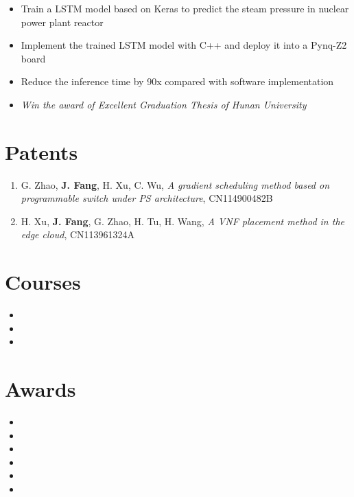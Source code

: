 \documentclass{resume}
\begin{document}
\begin{itemize}
  \item Train a LSTM model based on Keras to predict the steam pressure in nuclear power plant reactor
  \item Implement the trained LSTM model with C++ and deploy it into a Pynq-Z2 board
  \item Reduce the inference time by 90x compared with software implementation
  \item \textit{Win the award of Excellent Graduation Thesis of Hunan University}
\end{itemize}

\section{Patents}

\begin{enumerate}
  \item G. Zhao, \textbf{J. Fang}, H. Xu, C. Wu, \textit{A gradient scheduling method based on programmable switch under PS architecture}, CN114900482B
  \item H. Xu, \textbf{J. Fang}, G. Zhao, H. Tu, H. Wang, \textit{A VNF placement method in the edge cloud}, CN113961324A
\end{enumerate}

\section{Courses}

\begin{itemize}[parsep=0.5ex]
  \item {}
  \item {}
  \item {}
\end{itemize}

\section{Awards}

\begin{itemize}[parsep=0.5ex]
  \item {}
  \item {}
  \item {}
  \item {}
  \item {}
  \item {}
\end{itemize}
\end{document}
